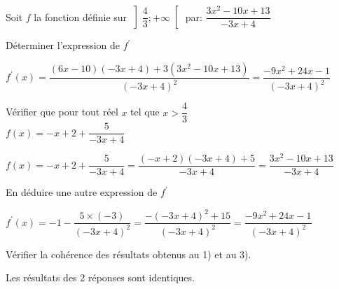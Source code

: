 \documentclass[12pt,a4paper]{article}  %
\begin{document}
Soit $f$ la fonction définie sur $\left] \dfrac{4}{3} ;+\infty\right[$ par: $\dfrac{3 x^{2}-10x+13}{-3 x+4}$
\begin{enumMet}
    \item Déterminer l'expression de $f^{\prime}$\\
    \begin{corrBox}
        $f^{\prime}(x)=\dfrac{(6 x-10)(-3 x+4)+3\left(3 x^{2}-10 x+13\right)}{(-3 x+4)^{2}}=\dfrac{-9 x^{2}+24 x-1}{(-3 x+4)^{2}}$
    \end{corrBox}
    \item Vérifier que pour tout réel $x$ tel que $x>\dfrac{4}{3}$\\ $f(x)=-x+2+\dfrac{5}{-3 x+4}$\\
    \begin{corrBox}
        $f(x)=-x+2+\dfrac{5}{-3 x+4}=\dfrac{(-x+2)(-3 x+4)+5}{-3 x+4}=\dfrac{3 x^{2}-10 x+13}{-3 x+4}$
    \end{corrBox}
    \item En déduire une autre expression de $f^{\prime}$\\
    \begin{corrBox}
        $f^{\prime}(x)=-1-\dfrac{5 \times(-3)}{(-3 x+4)^{2}}=\dfrac{-(-3 x+4)^{2}+15}{(-3 x+4)^{2}}=\dfrac{-9 x^{2}+24 x-1}{(-3 x+4)^{2}}$
    \end{corrBox}
    \item Vérifier la cohérence des résultats obtenus au 1) et au 3).\\
    \begin{corrBox}
        Les résultats des 2 réponses sont identiques.
    \end{corrBox}
\end{enumMet}

\end{document}
